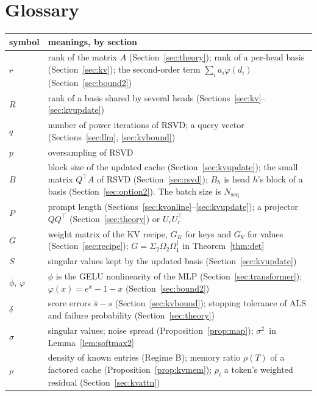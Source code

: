 \documentclass[10pt]{article}
\theoremstyle{plain}
\theoremstyle{definition}
\theoremstyle{remark}
\newcommand{\T}{^{\top}}
\begin{document}
\section{Glossary}
\label{app:glossary}
\begin{table}[!htb]
\centering\small
\begin{tabularx}{\textwidth}{@{}>{\raggedright}p{1.6cm} >{\raggedright\arraybackslash}X@{}}
\toprule
\textbf{symbol} & \textbf{meanings, by section}\\
\midrule
$r$ & rank of the matrix $A$ (Section~\ref{sec:theory}); rank of a per-head basis (Section~\ref{sec:kv}); the second-order term $\sum_ia_i\varphi(d_i)$ (Section~\ref{sec:bound2})\\
$R$ & rank of a basis shared by several heads (Sections~\ref{sec:kv}--\ref{sec:kvupdate})\\
$q$ & number of power iterations of RSVD; a query vector (Sections~\ref{sec:llm}, \ref{sec:kvbound})\\
$p$ & oversampling of RSVD\\
$B$ & block size of the updated cache (Section~\ref{sec:kvupdate}); the small matrix $Q\T A$ of RSVD (Section~\ref{sec:rsvd}); $B_h$ is head $h$'s block of a basis (Section~\ref{sec:option2}). The batch size is $N_{\mathrm{seq}}$\\
$P$ & prompt length (Sections~\ref{sec:kvonline}--\ref{sec:kvupdate}); a projector $QQ\T$ (Section~\ref{sec:theory}) or $U_rU_r\T$\\
$G$ & weight matrix of the KV recipe, $G_K$ for keys and $G_V$ for values (Section~\ref{sec:recipe}); $G=\Sigma_2\Omega_2\Omega_1^\dagger$ in Theorem~\ref{thm:det}\\
$S$ & singular values kept by the updated basis (Section~\ref{sec:kvupdate})\\
$\phi$, $\varphi$ & $\phi$ is the GELU nonlinearity of the MLP (Section~\ref{sec:transformer}); $\varphi(x)=e^x-1-x$ (Section~\ref{sec:bound2})\\
$\delta$ & score errors $\hat s-s$ (Section~\ref{sec:kvbound}); stopping tolerance of ALS and failure probability (Section~\ref{sec:theory})\\
$\sigma$ & singular values; noise spread (Proposition~\ref{prop:map}); $\sigma_-^2$ in Lemma~\ref{lem:softmax2}\\
$\rho$ & density of known entries (Regime B); memory ratio $\rho(T)$ of a factored cache (Proposition~\ref{prop:kvmem}); $\rho_i$ a token's weighted residual (Section~\ref{sec:kvattn})\\

\end{tabularx}
\end{table}
\end{document}
